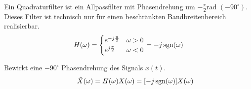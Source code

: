  \label{lti_quadratur}
Ein Quadraturfilter ist ein Allpassfilter mit Phasendrehung um
$-\frac{\pi}{2}\text{rad } (-90^\circ)$. Dieses Filter ist technisch nur für einen beschränkten Bandbreitenbereich realisierbar.
\[
H(\omega) = \begin{cases}
             	e^{-j \frac{\pi}{2}} & \omega > 0 \\
             	e^{j \frac{\pi}{2}} & \omega < 0
             \end{cases} =
-j \operatorname{sgn}(\omega)
\]

 \label{lti_hilbert}
Bewirkt eine $-90^\circ$ Phasendrehung des Signals $x(t)$.
$$\qquad \hat{X}(\omega) = H(\omega)X(\omega) = [-j \operatorname{sgn}(\omega)] X(\omega)$$
